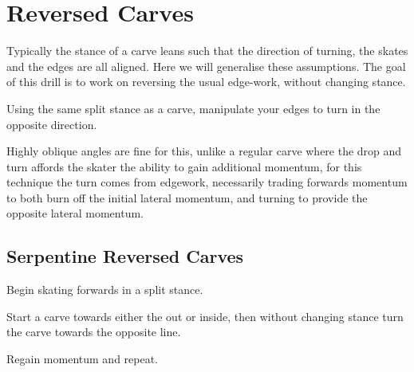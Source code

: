 \section{Reversed Carves}
\label{sec:sticky/reverse_carves}

Typically the stance of a carve leans such that the direction of turning, the skates and the edges are all aligned.    
Here we will generalise these assumptions. 
The goal of this drill is to work on reversing the usual edge-work, without changing stance.



Using the same split stance as a carve, manipulate your edges to turn in the opposite direction. 


Highly oblique angles are fine for this, unlike a regular carve where the drop and turn affords the skater the ability to gain additional momentum, for this technique the turn comes from edgework, necessarily trading forwards momentum to both burn off the initial lateral momentum, and turning to provide the opposite lateral momentum.    

\subsection*{Serpentine Reversed Carves}
\label{drill:sticky/reverse_carves/serpentine}

Begin skating forwards in a split stance.

Start a carve towards either the out or inside, then without changing stance turn the carve towards the opposite line. 

Regain momentum and repeat.
